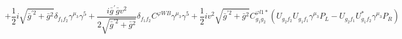 %
\begin{dmath*}
%
  +  \frac{1}{2} i \sqrt{{\bar g}^{\prime 2} + {\bar g}{}^2}\delta_{f_1 f_2} \gamma^{\mu_3} \gamma^5  +  \frac{i {\bar g}^\prime {\bar g}{} v^2}{2 \sqrt{{\bar g}^{\prime 2} + {\bar g}{}^2}}\delta_{f_1 f_2} C^{ \varphi  WB} \gamma^{\mu_3} \gamma^5  +  \frac{1}{2} i v^2 \sqrt{{\bar g}^{\prime 2} + {\bar g}{}^2}C^{ \varphi  l1*}_{g_1 g_2} \left(U_{g_2 f_2} U_{g_1 f_1} \gamma^{\mu_3} P_L - U_{g_2 f_1} U_{g_1 f_2}^* \gamma^{\mu_3} P_R\right)
%
\end{dmath*}
%

